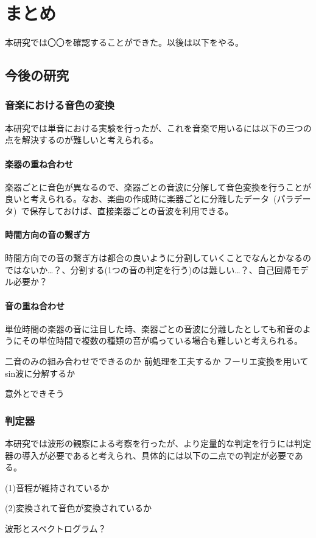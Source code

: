 \chapter{まとめ}

本研究では〇〇を確認することができた。以後は以下をやる。

\section{今後の研究}

\subsection{音楽における音色の変換}

本研究では単音における実験を行ったが、これを音楽で用いるには以下の三つの点を解決するのが難しいと考えられる。

\subsubsection{楽器の重ね合わせ}

楽器ごとに音色が異なるので、楽器ごとの音波に分解して音色変換を行うことが良いと考えられる。なお、楽曲の作成時に楽器ごとに分離したデータ~(パラデータ)~で保存しておけば、直接楽器ごとの音波を利用できる。


\subsubsection{時間方向の音の繋ぎ方}

時間方向での音の繋ぎ方は都合の良いように分割していくことでなんとかなるのではないか…？、分割する(1つの音の判定を行う)のは難しい…？、自己回帰モデル必要か？

\subsubsection{音の重ね合わせ}

単位時間の楽器の音に注目した時、楽器ごとの音波に分離したとしても和音のようにその単位時間で複数の種類の音が鳴っている場合も難しいと考えられる。

二音のみの組み合わせでできるのか
前処理を工夫するか
フーリエ変換を用いてsin波に分解するか

意外とできそう

\subsection{判定器}

本研究では波形の観察による考察を行ったが、より定量的な判定を行うには判定器の導入が必要であると考えられ、具体的には以下の二点での判定が必要である。

(1)音程が維持されているか

(2)変換されて音色が変換されているか

波形とスペクトログラム？